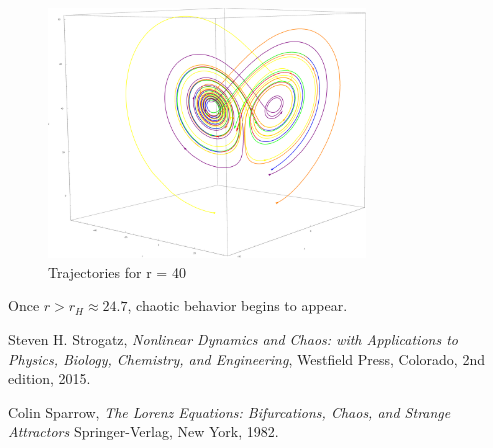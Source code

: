 \documentclass{report}
\begin{document}
\begin{figure}[h]
  \centering
  \includegraphics[width=0.75\textwidth]{r40.eps}
  \caption{Trajectories for r = 40}
  \label{fig:r_40}
\end{figure}

Once \(r > r_H \approx 24.7 \), chaotic behavior begins to appear.
\begin{thebibliography}{9}

  Steven H. Strogatz,
  \emph{Nonlinear Dynamics and Chaos: with Applications to Physics, Biology,
Chemistry, and Engineering},
  Westfield Press, Colorado,
  2nd edition,
  2015.

  Colin Sparrow,
  \emph{The Lorenz Equations: Bifurcations, Chaos, and Strange Attractors}
  Springer-Verlag, New York,
  1982.
\end{thebibliography}
\end{document}
